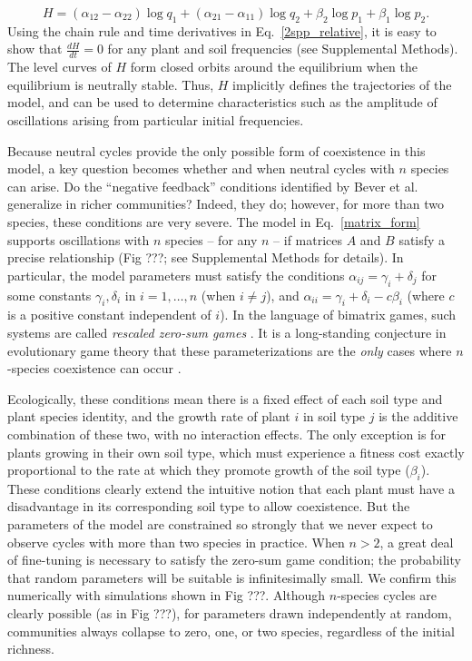 \documentclass[11pt]{article}
\begin{document}
\begin{equation}
	H = (\alpha_{12} - \alpha_{22}) \log q_1 + (\alpha_{21} - \alpha_{11}) \log q_2 + \beta_2 \log p_1 + \beta_1 \log p_2 .
\end{equation} 
Using the chain rule and time derivatives in Eq.~\ref{2spp_relative}, it is easy to show that $\frac{dH}{dt} = 0$ for any plant and soil frequencies (see Supplemental Methods). The level curves of $H$ form closed orbits around the equilibrium when the equilibrium is neutrally stable. Thus, $H$ implicitly defines the trajectories of the model, and can be used to determine characteristics such as the amplitude of oscillations arising from particular initial frequencies.

Because neutral cycles provide the only possible form of coexistence in this model, a key question becomes whether and when neutral cycles with $n$ species can arise. Do the ``negative feedback'' conditions identified by Bever et al. generalize in richer communities? Indeed, they do; however, for more than two species, these conditions are very severe. The model in Eq.~\ref{matrix_form} supports oscillations with $n$ species -- for any $n$ -- if matrices $A$ and $B$ satisfy a precise relationship (Fig ???; see Supplemental Methods for details). In particular, the model parameters must satisfy the conditions $\alpha_{ij} = \gamma_i + \delta_j$ for some constants $\gamma_i, \delta_i$ in $i = 1, \dots, n$ (when $i \neq j$), and $\alpha_{ii} = \gamma_i + \delta_i- c \beta_i$ (where $c$ is a positive constant independent of $i$). In the language of bimatrix games, such systems are called \emph{rescaled zero-sum games} \cite{hofbauer1996evolutionary,hofbauer1998evolutionary}. It is a long-standing conjecture in evolutionary game theory that these parameterizations are the \emph{only} cases where $n$-species coexistence can occur \cite{hofbauer1996evolutionary,hofbauer2011deterministic}.

Ecologically, these conditions mean there is a fixed effect of each soil type and plant species identity, and the growth rate of plant $i$ in soil type $j$ is the additive combination of these two, with no interaction effects. The only exception is for plants growing in their own soil type, which must experience a fitness cost exactly proportional to the rate at which they promote growth of the soil type ($\beta_i$).  
These conditions clearly extend the intuitive notion that each plant must have a disadvantage in its corresponding soil type to allow coexistence. But the parameters of the model are constrained so strongly that we never expect to observe cycles with more than two species in practice. When $n > 2$, a great deal of fine-tuning is necessary to satisfy the zero-sum game condition; the probability that random parameters will be suitable is infinitesimally small. We confirm this numerically with simulations shown in Fig ???. Although $n$-species cycles are clearly possible (as in Fig ???), for parameters drawn independently at random, communities always collapse to zero, one, or two species, regardless of the initial richness. 
\end{document}
